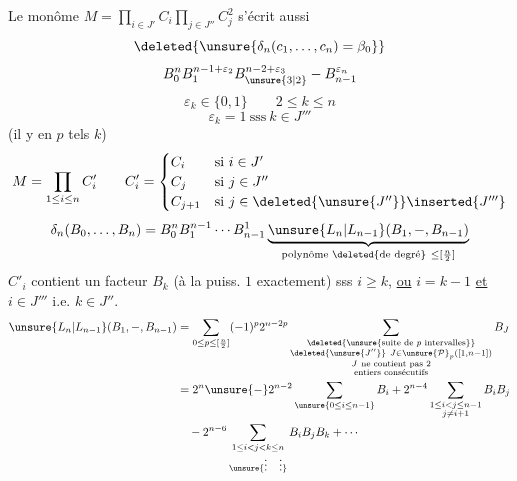 Le monôme $M=\prod_{i\in J'}C_i\prod_{j\in J''}C_j^2$
s'écrit aussi
\[
\deleted{\unsure{\delta_n(c_1,\ldots,c_n)=\beta_0}}
\]
\[
B_0^n B_1^{n-1+\varepsilon_2}
B_{\unsure{3|2}}^{n-2+\varepsilon_3}\mathbin{-}B_{n-1}^{\varepsilon_n}
\]
\[
\varepsilon_k\in\{0,1\}\qquad2\leq k\leq n
\]
\[
\varepsilon_k=1\ \text{sss}\ k\in J'''
\]
(il y en  $p$ tels $k$)
\[
M=\prod_{1\leq i\leq n}C'_i\qquad
C'_i=\begin{cases}
C_i&\text{si }i\in J'\\
C_j&\text{si }j\in J''\\
C_{j+1}&\text{si }j\in\deleted{\unsure{J''}}\inserted{J'''}
\end{cases}
\]
\[
\delta_n(B_0,\ldots,B_n)
=B_0^nB_1^{n-1}\cdots B_{n-1}^{1}
\underbrace{\unsure{L_n|L_{n-1}}(B_1,\mathbin{-},B_{n-1})}_{
\text{polynôme }\deleted{\text{de degré}}\ \leq[\frac n2]}
\]
$C'_i$ contient un facteur \uline{$B_k$}
(à la puiss. $1$ exactement) sss
$i\geq k$, \uline{ou} $i=k-1$ \uline{et}
$i\in J'''$ i.e. $k\in J''$.
\[
\begin{aligned}
\unsure{L_n|L_{n-1}}(B_1,\mathbin{-},B_{n-1})
&=\sum_{0\leq p\leq[\frac n2]}(-1)^p2^{n-2p}
\sum_{\substack{\deleted{\unsure{\text{suite de }p\text{ intervalles}}}\\
\deleted{\unsure{J''}}\ J\in\unsure{\mathcal P}_p([1,n-1])\\
J\ \text{ne contient pas }2\\\text{entiers consécutifs}}}
B_J\\
&=2^n\unsure{-}2^{n-2}\sum_{\unsure{0\leq i\leq n-1}}B_i
+2^{n-4}\sum_{\substack{1\leq i<j\leq n-1\\j\neq i+1}}B_iB_j\\
&\quad-2^{n-6}\sum_{\substack{1\leq i<j<k\leq n\\\unsure{\vdots\quad\vdots}}}
B_iB_jB_k+\cdots
\end{aligned}
\]

